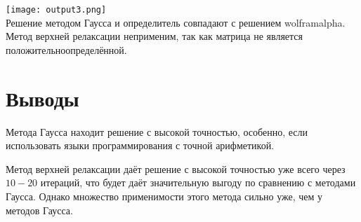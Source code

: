 \documentclass[a4paper,12pt,titlepage,finall]{article}
\begin{document}
\texttt{[image: output3.png]}
\\
Решение методом Гаусса и определитель совпадают с решением wolframalpha. Метод верхней релаксации неприменим, так как матрица не является положительноопределённой.
\newpage

\section{Выводы}

Метода Гаусса находит решение с высокой точностью, особенно, если использовать языки программирования с точной арифметикой.

Метод верхней релаксации даёт решение с высокой точностью уже всего через $10-20$ итераций, что будет даёт значительную выгоду по сравнению с методами Гаусса. Однако множество применимости этого метода сильно уже, чем у методов Гаусса.

\newpage
\end{document}
